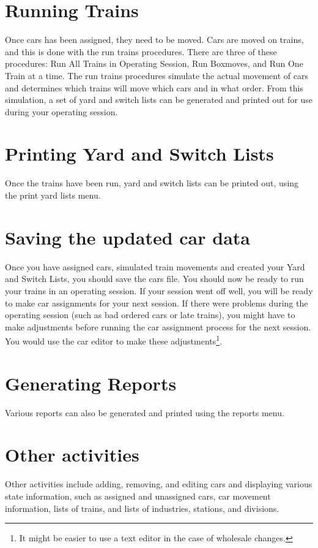 \section{Running Trains}

Once cars has been assigned, they need to be moved.  Cars are moved on
trains, and this is done with the run trains procedures.  There are
three of these procedures: Run All Trains in Operating Session, Run
Boxmoves, and Run One Train at a time.  The run trains procedures
simulate the actual movement of cars and determines which trains will
move which cars and in what order.  From this simulation, a set of yard
and switch lists can be generated and printed out for use during your
operating session.

\section{Printing Yard and Switch Lists}

Once the trains have been run, yard and switch lists can be printed
out, using the print yard lists menu.

\section{Saving the updated car data}

Once you have assigned cars, simulated train movements and created your
Yard and Switch Lists, you should save the cars file.  You should now
be ready to run your trains in an operating session.  If your session
went off well, you will be ready to make car assignments for your next
session.  If there were problems during the operating session (such as
bad ordered cars or late trains), you might have to make adjustments
before running the car assignment process for the next session.  You
would use the car editor to make these adjustments\footnote{It might be
easier to use a text editor in the case of wholesale changes.}.

\section{Generating Reports}

Various reports can also be generated and printed using the reports
menu. 

\section{Other activities}

Other activities include adding, removing, and editing cars and
displaying various state information, such as assigned and unassigned
cars, car movement information, lists of trains, and lists of
industries, stations, and divisions.
